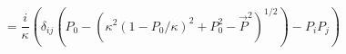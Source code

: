 \begin{equation}
 [x_{i},P_{j}]=\frac{i}{\kappa}\left(\delta_{ij}\left(P_{0}-(\kappa^{2}(1-P_{0}/\kappa)^{2}+P_{0}^{2}-\vec{P}^{2})^{1/2}\right)
 -P_{i}P_{j} \right)
\end{equation}

